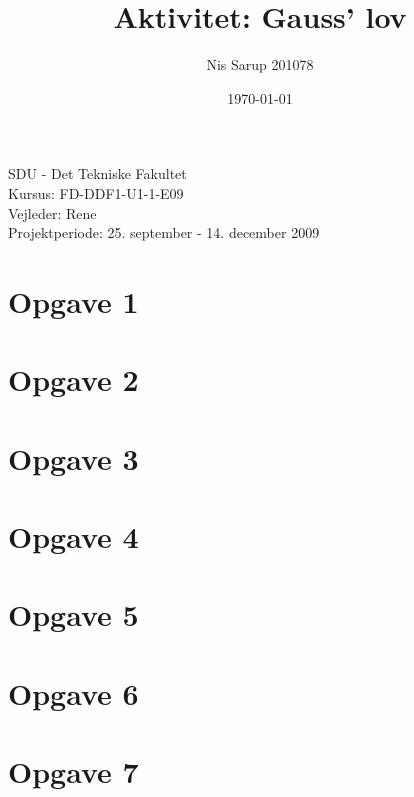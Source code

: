 \documentclass[a4wide,10pt]{article}
\begin{document}
\title{Aktivitet: Gauss’ lov}
\author{Nis Sarup 201078}
\date{\today}
\maketitle
\begin{center}
	SDU - Det Tekniske Fakultet\\
	Kursus: FD-DDF1-U1-1-E09\\
	Vejleder: Rene \\
	Projektperiode: 25. september - 14. december 2009\\
\end{center}
\newpage

\section{Opgave 1} %
\label{sec:opgave_1}

\newpage

\section{Opgave 2} %
\label{sec:opgave_2}


\section{Opgave 3} %
\label{sec:opgave_3}


\section{Opgave 4} %
\label{sec:opgave_4}

\newpage

\section{Opgave 5} %
\label{sec:opgave_5}


\section{Opgave 6} %
\label{sec:opgave_6}


\section{Opgave 7} %
\label{sec:opgave_7}

\newpage
\end{document}
